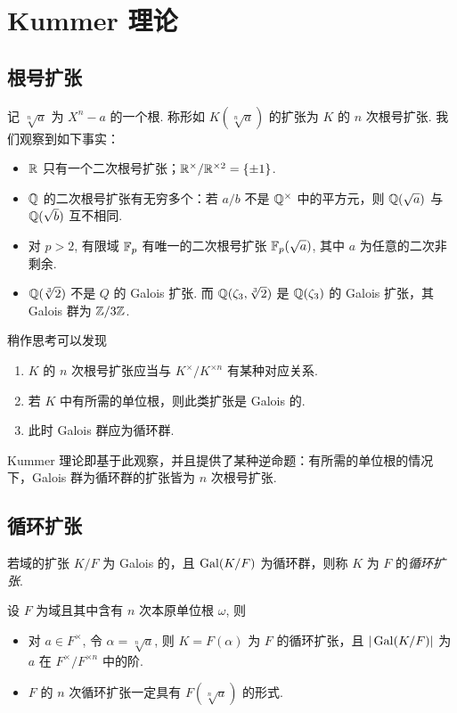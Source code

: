 \chapter{Kummer 理论}

\section{根号扩张}
记 $\sqrt[n]{a}$ 为 $X^n - a$ 的一个根.  称形如 $K(\sqrt[n]{a})$ 的扩张为 $K$ 的 $n$ 次根号扩张.  我们观察到如下事实：
\begin{fact}
  \begin{itemize}
  \item $\mathbb R$ 只有一个二次根号扩张；$\mathbb R^\times / \mathbb R^{\times2} = \{\pm 1\}$.
  \item $\mathbb Q$ 的二次根号扩张有无穷多个：若 $a/b$ 不是 $\mathbb Q^\times$ 中的平方元，则 $\mathbb Q(\sqrt a)$ 与 $\mathbb Q(\sqrt b)$ 互不相同.
  \item 对 $p > 2$, 有限域 $\mathbb F_p$ 有唯一的二次根号扩张 $\mathbb F_p(\sqrt a)$, 其中 $a$ 为任意的二次非剩余.
  \item $\mathbb Q(\sqrt[3]{2})$ 不是 $Q$ 的 Galois 扩张.  而 $\mathbb Q(\zeta_3, \sqrt[3]{2})$ 是 $\mathbb Q(\zeta_3)$ 的 Galois 扩张，其 Galois 群为 $\mathbb Z/3\mathbb Z$.
  \end{itemize}
\end{fact}
稍作思考可以发现
\begin{obs}
  \begin{enumerate}
  \item $K$ 的 $n$ 次根号扩张应当与 $K^\times / K^{\times n}$ 有某种对应关系.
  \item 若 $K$ 中有所需的单位根，则此类扩张是 Galois 的.
  \item 此时 Galois 群应为循环群.
  \end{enumerate}
\end{obs}

Kummer 理论即基于此观察，并且提供了某种逆命题：有所需的单位根的情况下，Galois 群为循环群的扩张皆为 $n$ 次根号扩张.

\section{循环扩张}
\begin{defn}
  若域的扩张 $K/F$ 为 Galois 的，且 $\operatorname{Gal}(K/F)$ 为循环群，则称 $K$ 为 $F$ 的\emph{循环扩张}.
\end{defn}

\begin{thm}
  设 $F$ 为域且其中含有 $n$ 次本原单位根 $\omega$, 则
  \begin{itemize}
  \item 对 $a \in F^\times$, 令 $\alpha = \sqrt[n]{a}$, 则 $K = F(\alpha)$ 为 $F$ 的循环扩张，且 $|\operatorname{Gal}(K/F)|$ 为 $a$ 在 $F^\times / F^{\times n}$ 中的阶.
  \item $F$ 的 $n$ 次循环扩张一定具有 $F(\sqrt[n]{a})$ 的形式.
  \end{itemize}
\end{thm}

